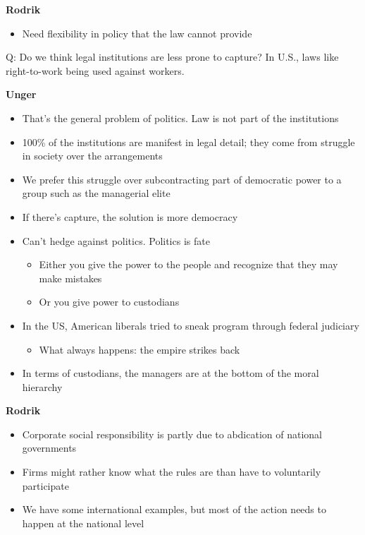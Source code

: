 \textbf{Rodrik}

\begin{itemize}
\tightlist
\item
  Need flexibility in policy that the law cannot provide
\end{itemize}

Q: Do we think legal institutions are less prone to capture? In U.S.,
laws like right-to-work being used against workers.

\textbf{Unger}

\begin{itemize}
\tightlist
\item
  That's the general problem of politics. Law is not part of the
  institutions
\item
  100\% of the institutions are manifest in legal detail; they come from
  struggle in society over the arrangements
\item
  We prefer this struggle over subcontracting part of democratic power
  to a group such as the managerial elite
\item
  If there's capture, the solution is more democracy
\item
  Can't hedge against politics. Politics is fate

  \begin{itemize}
  \tightlist
  \item
    Either you give the power to the people and recognize that they may
    make mistakes
  \item
    Or you give power to custodians
  \end{itemize}
\item
  In the US, American liberals tried to sneak program through federal
  judiciary

  \begin{itemize}
  \tightlist
  \item
    What always happens: the empire strikes back
  \end{itemize}
\item
  In terms of custodians, the managers are at the bottom of the moral
  hierarchy
\end{itemize}

\textbf{Rodrik}

\begin{itemize}
\tightlist
\item
  Corporate social responsibility is partly due to abdication of
  national governments
\item
  Firms might rather know what the rules are than have to voluntarily
  participate
\item
  We have some international examples, but most of the action needs to
  happen at the national level
\end{itemize}

